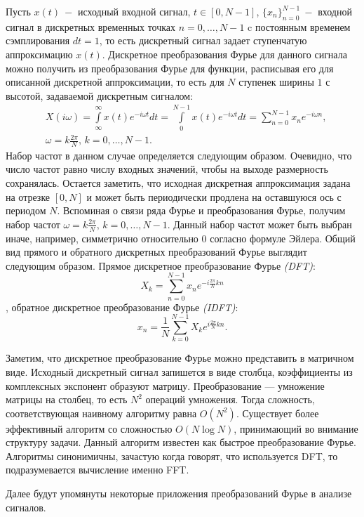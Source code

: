 Пусть $x(t) ~-$ исходный входной сигнал,  $t \in [0, N-1]$, $\{x_n\}_{n=0}^{N-1} ~-$ входной сигнал в дискретных временных точках $n=0,\dots,N-1$ c постоянным временем сэмплирования $dt=1$, то есть дискретный сигнал задает ступенчатую аппроксимацию $x(t)$.
Дискретное преобразования Фурье для данного сигнала можно получить из преобразования Фурье для функции, расписывая его для описанной дискретной аппроксимации, то есть для $N$ ступенек ширины $1$ с высотой, задаваемой дискретным сигналом:
\begin{align*}  
& X(i \omega) = \int \limits_{\infty}^{\infty} x(t) e^{-i\omega t} dt = \int \limits_{0}^{N-1} x(t) e^{-i\omega t} dt = \sum \limits _{n=0}^{N-1} x_n e^{-i \omega n},\\
& \omega=k \frac{2 \pi}{N}, \, k=0,\dots,N-1.
\end{align*}
Набор частот в данном случае определяется следующим образом. Очевидно, что число частот равно числу входных значений, чтобы на выходе размерность сохранялась. Остается заметить, что исходная дискретная аппроксимация задана на отрезке $[0, N]$ и может быть периодически продлена на оставшуюся ось с периодом $N$. Вспоминая о связи ряда Фурье и преобразования Фурье, получим набор частот $\omega=k \frac{2 \pi}{N}, \, k=0,\dots,N-1$. Данный набор частот может быть выбран иначе, например, симметрично относительно $0$ согласно формуле Эйлера.
Общий вид прямого и обратного дискретных преобразований Фурье выглядит следующим образом. Прямое дискретное преобразование Фурье \textit{(DFT)}: 
$$X_k = \sum \limits _{n=0}^{N-1} x_n e^{-i\frac{2 \pi}{N}kn}$$,
обратное дискретное преобразование Фурье \textit{(IDFT)}:
$$x_n = \frac{1}{N} \sum \limits _{k=0}^{N-1} X_k e^{i\frac{2 \pi}{N}kn}.$$ 

Заметим, что дискретное преобразование Фурье можно представить в матричном виде. Исходный дискретный сигнал запишется в виде столбца, коэффициенты из комплексных экспонент образуют матрицу. Преобразование — умножение матрицы на столбец, то есть $N^2$ операций умножения.  Тогда сложность, соответствующая наивному алгоритму равна $O(N^2)$. Существует более эффективный алгоритм со сложностью $O(N \log N)$, принимающий во внимание структуру задачи. Данный алгоритм известен как быстрое преобразование Фурье. Алгоритмы синонимичны, зачастую когда говорят, что используется DFT, то подразумевается вычисление именно FFT.

Далее будут упомянуты некоторые приложения преобразований Фурье в анализе сигналов. 

